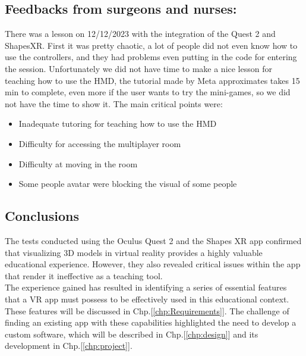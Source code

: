 \subsection{Feedbacks from surgeons and nurses:}
\noindent
There was a lesson on 12/12/2023 with the integration of the Quest 2 and ShapesXR. First it was pretty chaotic, a lot of people did not even know how to use the controllers,
and they had problems even putting in the code for entering the session. Unfortunately we did not have time to make a nice lesson for teaching how to use the HMD,
the tutorial made by Meta approximates takes 15 min to complete, even more if the user wants to try the mini-games, so we did not have the time to show it. The main critical points were: 


\begin{itemize}
  \item Inadequate tutoring for teaching how to use the \ac{HMD}
  \item Difficulty for accessing the multiplayer room
  \item Difficulty at moving in the room
  \item Some people avatar were blocking the visual of some people
\end{itemize}

\subsection{Conclusions}
\noindent
The tests conducted using the Oculus Quest 2 and the Shapes XR app confirmed that visualizing 3D models in virtual reality provides a highly valuable educational experience.
However, they also revealed critical issues within the app that render it ineffective as a teaching tool.\\
The experience gained has resulted in identifying a series of essential features that a VR app must possess to be effectively used in this educational context.
These features will be discussed in Chp.[\ref{chp:Requirements}]. The challenge of finding an existing app with these capabilities highlighted the need to develop a custom software, which will be described in Chp.[\ref{chp:design}] and its development in Chp.[\ref{chp:project}].
